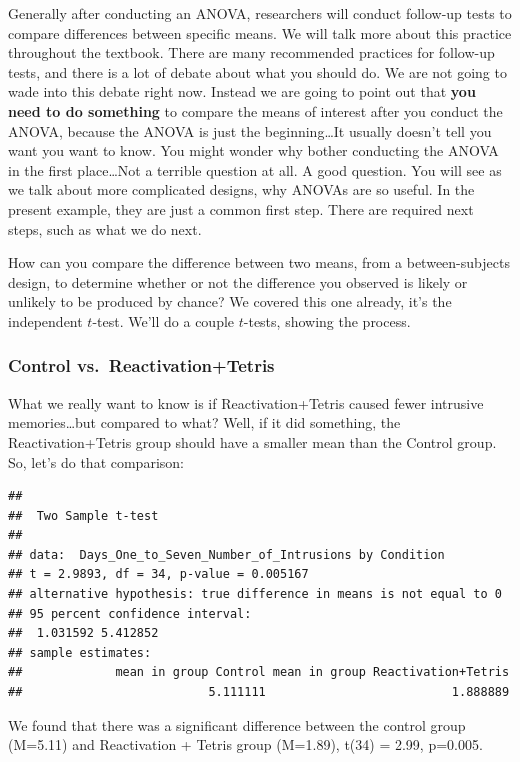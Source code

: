 \documentclass[
]{book}
\begin{document}
Generally after conducting an ANOVA, researchers will conduct follow-up tests to compare differences between specific means. We will talk more about this practice throughout the textbook. There are many recommended practices for follow-up tests, and there is a lot of debate about what you should do. We are not going to wade into this debate right now. Instead we are going to point out that \textbf{you need to do something} to compare the means of interest after you conduct the ANOVA, because the ANOVA is just the beginning\ldots It usually doesn't tell you want you want to know. You might wonder why bother conducting the ANOVA in the first place\ldots Not a terrible question at all. A good question. You will see as we talk about more complicated designs, why ANOVAs are so useful. In the present example, they are just a common first step. There are required next steps, such as what we do next.

How can you compare the difference between two means, from a between-subjects design, to determine whether or not the difference you observed is likely or unlikely to be produced by chance? We covered this one already, it's the independent \(t\)-test. We'll do a couple \(t\)-tests, showing the process.

\hypertarget{control-vs.-reactivationtetris}{%
\subsubsection{Control vs.~Reactivation+Tetris}\label{control-vs.-reactivationtetris}}

What we really want to know is if Reactivation+Tetris caused fewer intrusive memories\ldots but compared to what? Well, if it did something, the Reactivation+Tetris group should have a smaller mean than the Control group. So, let's do that comparison:

\begin{verbatim}
## 
## 	Two Sample t-test
## 
## data:  Days_One_to_Seven_Number_of_Intrusions by Condition
## t = 2.9893, df = 34, p-value = 0.005167
## alternative hypothesis: true difference in means is not equal to 0
## 95 percent confidence interval:
##  1.031592 5.412852
## sample estimates:
##             mean in group Control mean in group Reactivation+Tetris 
##                          5.111111                          1.888889
\end{verbatim}

We found that there was a significant difference between the control group (M=5.11) and Reactivation + Tetris group (M=1.89), t(34) = 2.99, p=0.005.
\end{document}
